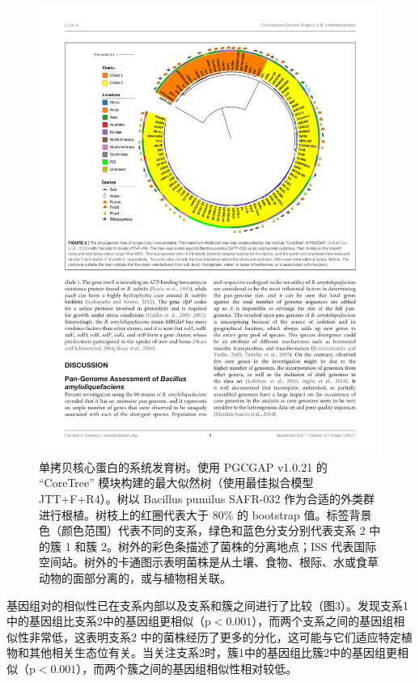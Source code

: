 \documentclass[UTF8]{ctexart}
\begin{document}
\begin{figure}[!htb]
    \centering
    \includegraphics[width=\textwidth]{figures/figure2.pdf}
    \caption{单拷贝核心蛋白的系统发育树。使用 PGCGAP v1.0.21 的 ``CoreTree'' 模块构建的最大似然树（使用最佳拟合模型 JTT+F+R4）。树以 Bacillus pumilus SAFR-032 作为合适的外类群进行根植。树枝上的红圈代表大于 80\% 的 bootstrap 值。标签背景色（颜色范围）代表不同的支系，绿色和蓝色分支分别代表支系 2 中的簇 1 和簇 2。树外的彩色条描述了菌株的分离地点；ISS 代表国际空间站。树外的卡通图示表明菌株是从土壤、食物、根际、水或食草动物的面部分离的，或与植物相关联。}
\end{figure}

基因组对的相似性已在支系内部以及支系和簇之间进行了比较（图3）。发现支系1中的基因组比支系2中的基因组更相似（$\mathrm{p < 0.001}$），而两个支系之间的基因组相似性非常低，这表明支系2 中的菌株经历了更多的分化，这可能与它们适应特定植物和其他相关生态位有关。当关注支系2时，簇1中的基因组比簇2中的基因组更相似（$\mathrm{p < 0.001}$），而两个簇之间的基因组相似性相对较低。
\end{document}
